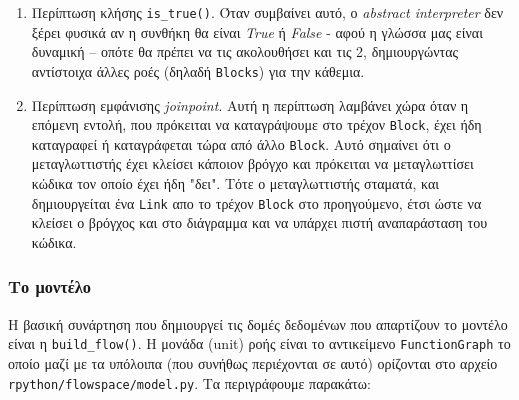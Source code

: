 \begin{enumerate}

\item Περίπτωση κλήσης \texttt{is\_true()}. Όταν συμβαίνει αυτό, ο \textit{
abstract interpreter} δεν ξέρει φυσικά αν η συνθήκη θα είναι \textit{True} ή
\textit{False} - αφού η γλώσσα μας είναι δυναμική – οπότε θα πρέπει να τις 
ακολουθήσει και τις 2, δημιουργώντας αντίστοιχα άλλες ροές (δηλαδή
\texttt{Blocks}) για την κάθεμια.

\item Περίπτωση εμφάνισης \textit{joinpoint}. Αυτή η περίπτωση λαμβάνει χώρα
όταν η επόμενη εντολή, που πρόκειται να καταγράψουμε στο τρέχον \texttt{Block},
έχει ήδη καταγραφεί ή καταγράφεται τώρα από άλλο \texttt{Block}. Αυτό σημαίνει
ότι ο μεταγλωττιστής έχει κλείσει κάποιον βρόγχο και πρόκειται να μεταγλωττίσει
κώδικα τον οποίο έχει ήδη "δει". Τότε ο μεταγλωττιστής σταματά, και
δημιουργείται ένα \texttt{Link} απο το τρέχον \texttt{Block} στο προηγούμενο,
έτσι ώστε να κλείσει ο βρόγχος και στο διάγραμμα και να υπάρχει πιστή
αναπαράσταση του κώδικα.

\end{enumerate}

\subsubsection{Το μοντέλο}

Η βασική συνάρτηση που δημιουργεί τις δομές δεδομένων που απαρτίζουν το μοντέλο
είναι η \texttt{build\_flow()}. Η μονάδα (unit) ροής είναι το αντικείμενο
\texttt{FunctionGraph} το οποίο μαζί με τα υπόλοιπα (που συνήθως περιέχονται σε
αυτό) ορίζονται στο αρχείο \texttt{rpython/flowspace/model.py}. Τα περιγράφουμε
παρακάτω:

